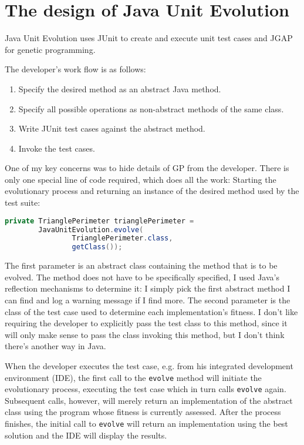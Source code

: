 \documentclass[a4paper]{article}
\begin{document}
\section{The design of Java Unit Evolution}

Java Unit Evolution uses JUnit to create and execute unit test cases
and JGAP for genetic programming.

The developer's work flow is as follows:

\begin{enumerate}
\item Specify the desired method as an abstract Java method.
\item Specify all possible operations as non-abstract methods of the
  same class.
\item Write JUnit test cases against the abstract method.
\item Invoke the test cases.
\end{enumerate}

One of my key concerns was to hide details of GP from the
developer. There is only one special line of code required, which does
all the work: Starting the evolutionary process and returning an
instance of the desired method used by the test suite:

\begin{lstlisting}[language=java]
private TrianglePerimeter trianglePerimeter =
        JavaUnitEvolution.evolve(
                TrianglePerimeter.class,
                getClass());
\end{lstlisting}

The first parameter is an abstract class containing the method that is
to be evolved. The method does not have to be specifically specified,
I used Java's reflection mechanisms to determine it: I simply pick the
first abstract method I can find and log a warning message if I find
more. The second parameter is the class of the test case used to
determine each implementation's fitness. I don't like requiring the
developer to explicitly pass the test class to this method, since it
will only make sense to pass the class invoking this method, but I
don't think there's another way in Java.

When the developer executes the test case, e.g. from his integrated
development environment (IDE), the first call to the \verb!evolve!
method will initiate the evolutionary process, executing the test case
which in turn calls \verb!evolve! again. Subsequent calls, however,
will merely return an implementation of the abstract class using the
program whose fitness is currently assessed. After the process
finishes, the initial call to \verb!evolve! will return an
implementation using the best solution and the IDE will display the
results.
\end{document}
